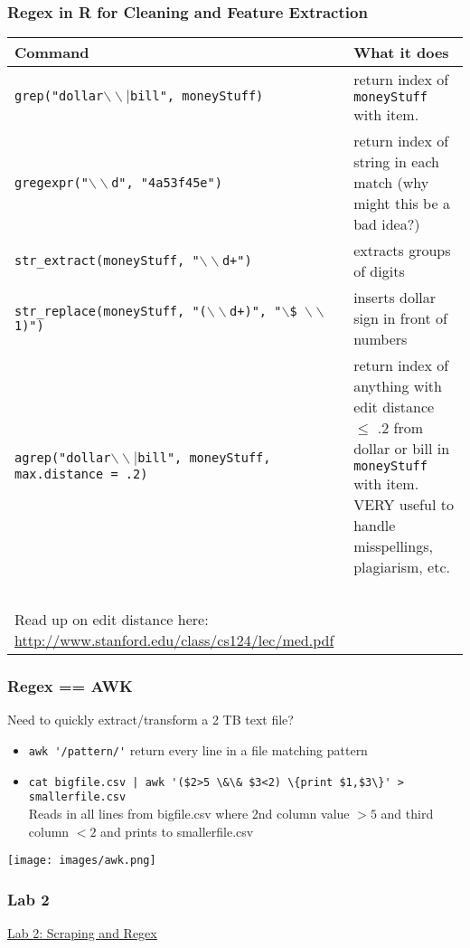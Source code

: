 \documentclass[]{beamer}
\begin{document}
\begin{frame}
\frametitle{Regex in R for Cleaning and Feature Extraction}   %
\footnotesize
\begin{tabular}{p{2.5in}p{1.5in}}
Command & What it does \\ \hline
\texttt{grep("dollar$\backslash\backslash|$bill", moneyStuff)} & return index of \texttt{moneyStuff} with item.\\
\texttt{gregexpr("$\backslash\backslash$d", "4a53f45e")} & return index of string in each match (why might this be a bad idea?)\\
\texttt{str\_extract(moneyStuff, "$\backslash\backslash$d+")} & extracts groups of digits \\
\texttt{str\_replace(moneyStuff, "($\backslash\backslash$d+)", "$\backslash$\$ $\backslash\backslash$1)")} & inserts dollar sign in front of numbers \\
\texttt{agrep("dollar$\backslash\backslash|$bill", moneyStuff, max.distance = .2)} & return index of anything with edit distance $\leq$ .2 from dollar or bill in \texttt{moneyStuff} with item.  VERY useful to handle misspellings, plagiarism, etc.\\~\\
\small Read up on edit distance here: \url{http://www.stanford.edu/class/cs124/lec/med.pdf}
\end{tabular}
\end{frame}

\begin{frame}
\frametitle{Regex == AWK}   %
Need to quickly extract/transform a 2 TB text file? \\
\begin{itemize}
  \item \verb~awk '/pattern/'~ return every line in a file matching pattern\\
  \item \verb~cat bigfile.csv | awk '($2>5 \&\& $3<2) \{print $1,$3\}' > smallerfile.csv~\\
  Reads in all lines from bigfile.csv where 2nd column value $>5$  and third column $<2$ and prints to smallerfile.csv
\end{itemize}
\begin{center} \texttt{[image: images/awk.png]} \end{center}
\end{frame}

\begin{frame}
\frametitle{Lab 2}   %
\center \href{https://dl.dropbox.com/u/25710348/CSSscraping/scripts/RegexCurl.R}{\color{blue} Lab 2: Scraping and Regex}
\end{frame}
\end{document}
